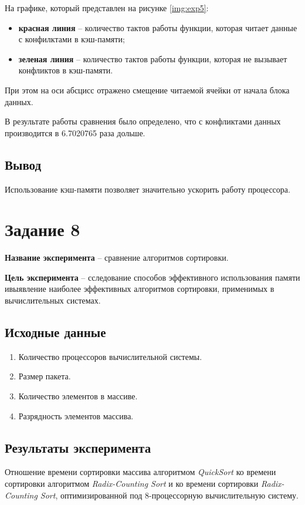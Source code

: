 На графике, который представлен на рисунке \ref{img:exp5}:
\begin{itemize}
    \item \textbf{красная линия} -- количество тактов работы функции, которая
        читает данные с конфилктами в кэш-памяти;
    \item \textbf{зеленая линия} -- количество тактов работы функции, которая
        не вызывает конфликтов в кэш-памяти.
\end{itemize}

При этом на оси абсцисс отражено смещение читаемой ячейки от начала блока
данных.



В результате работы сравнения было определено, что с конфликтами данных
производится в 6.7020765 раза дольше.

\subsection{Вывод}

Использование кэш-памяти позволяет значительно ускорить работу процессора.

\section{Задание 8}

\textbf{Название эксперимента} -- сравнение алгоритмов сортировки.

\textbf{Цель эксперимента} -- сследование способов эффективного использования
памяти ивыявление наиболее эффективных алгоритмов сортировки, применимых в
вычислительных системах.

\subsection{Исходные данные}
\begin{enumerate}
	\item Количество процессоров вычислительной системы.
	\item Размер пакета.
	\item Количество элементов в массиве.
	\item Разрядность элементов массива.
\end{enumerate}

\subsection{Результаты эксперимента}
Отношение времени сортировки массива алгоритмом \textit{QuickSort} ко времени
сортировки алгоритмом \textit{Radix-Counting Sort} и ко времени сортировки
\textit{Radix-Counting Sort}, оптимизированной под 8-процессорную
вычислительную систему.

